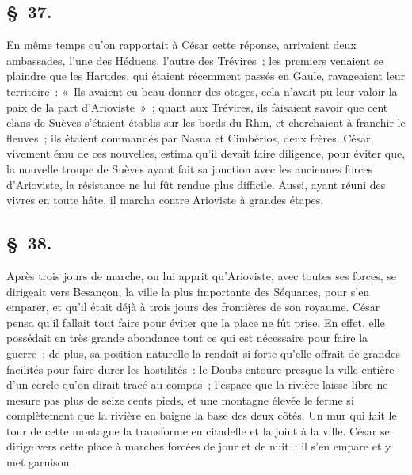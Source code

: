 \documentclass[french,twoside]{book} %
\begin{document}
\subsection[{§ 37.}]{ \textsc{§ 37.} }
\noindent En même temps qu’on rapportait à César cette réponse, arrivaient deux ambassades, l’une des Héduens, l’autre des Trévires ; les premiers venaient se plaindre que les Harudes, qui étaient récemment passés en Gaule, ravageaient leur territoire : « Ils avaient eu beau donner des otages, cela n’avait pu leur valoir la paix de la part d’Arioviste » ; quant aux Trévires, ils faisaient savoir que cent clans de Suèves s’étaient établis sur les bords du Rhin, et cherchaient à franchir le fleuves ; ils étaient commandés par Nasua et Cimbérios, deux frères. César, vivement ému de ces nouvelles, estima qu’il devait faire diligence, pour éviter que, la nouvelle troupe de Suèves ayant fait sa jonction avec les anciennes forces d’Arioviste, la résistance ne lui fût rendue plus difficile. Aussi, ayant réuni des vivres en toute hâte, il marcha contre Arioviste à grandes étapes.
\subsection[{§ 38.}]{ \textsc{§ 38.} }
\noindent Après trois jours de marche, on lui apprit qu’Arioviste, avec toutes ses forces, se dirigeait vers Besançon, la ville la plus importante des Séquanes, pour s’en emparer, et qu’il était déjà à trois jours des frontières de son royaume. César pensa qu’il fallait tout faire pour éviter que la place ne fût prise. En effet, elle possédait en très grande abondance tout ce qui est nécessaire pour faire la guerre ; de plus, sa position naturelle la rendait si forte qu’elle offrait de grandes facilités pour faire durer les hostilités : le Doubs entoure presque la ville entière d’un cercle qu’on dirait tracé au compas ; l’espace que la rivière laisse libre ne mesure pas plus de seize cents pieds, et une montagne élevée le ferme si complètement que la rivière en baigne la base des deux côtés. Un mur qui fait le tour de cette montagne la transforme en citadelle et la joint à la ville. César se dirige vers cette place à marches forcées de jour et de nuit ; il s’en empare et y met garnison.
\end{document}
